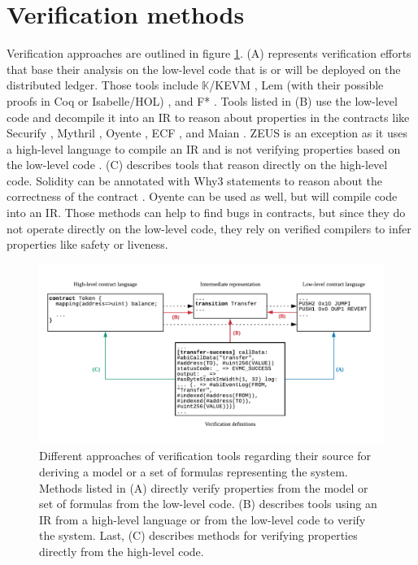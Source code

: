 \section{Verification methods}
\label{verification}

Verification approaches are outlined in figure \ref{fig:verification}. 
(A) represents verification efforts that base their analysis on the low-level code that is or will be deployed on the distributed ledger. Those tools include $\mathbb{K}$/KEVM \cite{Hildenbrandt2017}, Lem (with their possible proofs in Coq or Isabelle/HOL) \cite{Hirai2017}, and F* \cite{Bhargavan2016,Grishchenko2018}.
Tools listed in (B) use the low-level code and decompile it into an IR to reason about properties in the contracts like Securify \cite{Tsankov2017}, Mythril \cite{Mueller2018}, Oyente \cite{Luu2016,Albert2018}, ECF \cite{Grossman2017}, and Maian \cite{Nikolic2018}. ZEUS is an exception as it uses a high-level language to compile an IR and is not verifying properties based on the low-level code \cite{Kalra2018}.
(C) describes tools that reason directly on the high-level code. Solidity can be annotated with Why3 statements to reason about the correctness of the contract \cite{Reitwiessner2015Why3}. Oyente can be used as well, but will compile code into an IR. Those methods can help to find bugs in contracts, but since they do not operate directly on the low-level code, they rely on verified compilers to infer properties like safety or liveness.


\begin{figure}
\label{fig:verification}
\includegraphics[width=\textwidth]{fig/Verification.pdf}
\caption{Different approaches of verification tools regarding their source for deriving a model or a set of formulas representing the system. Methods listed in (A) directly verify properties from the model or set of formulas from the low-level code. (B) describes tools using an IR from a high-level language or from the low-level code to verify the system. Last, (C) describes methods for verifying properties directly from the high-level code.}
\end{figure}

